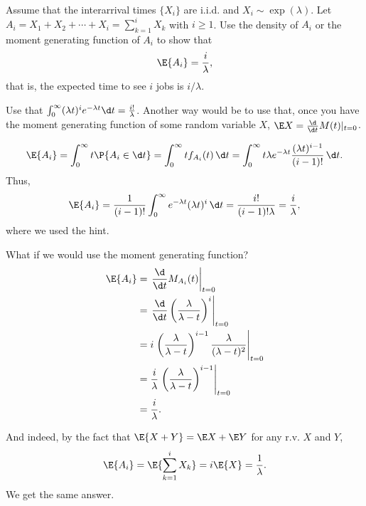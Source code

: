   \begin{question}
    Assume that the interarrival times $\{X_i\}$ are i.i.d. and
    $X_i\sim\exp(\lambda)$. Let
    $A_i=X_1+X_2+\cdots+X_i=\sum_{k=1}^i X_k$ with $i\geq 1$. Use the
    density of $A_i$ or the moment generating function of $A_i$ to
    show that
 \begin{equation*}
\E{A_i} = \frac i\lambda,
 \end{equation*}
 that is, the expected time to see $i$ jobs is $i/\lambda$.
 \begin{hint}
Use that
    $\int_0^\infty (\lambda t)^i e^{- \lambda t} \d t =
    \frac{i!}\lambda$.
    Another way would be to use that, once you have the moment
    generating function of some random variable $X$,
    $\E X = \frac{\d}{\d t} M(t) |_{t=0}$. 
 \end{hint}
  \begin{solution}
  \begin{equation*}
\E{A_i} = \int_0^\infty t \P{A_i \in \d t} = \int_0^\infty t f_{A_i} (t) \, \d t  = 
\int_0^\infty t  \lambda e^{-\lambda t} \frac{(\lambda t)^{i-1}}{(i-1)!}\, \d t.
  \end{equation*}
Thus, 
  \begin{equation*}
\E{A_i} = \frac{1}{(i-1)!} \int_0^\infty   e^{-\lambda t} (\lambda t)^i\,\d t = \frac{i!}{(i-1)!\lambda}=\frac{i}\lambda,
  \end{equation*}
  where we used the hint.

What if we would use the moment generating function? 
\begin{equation*}
  \begin{split}
    \E{A_i} 
&= \left.\frac{\d}{\d t} M_{A_i}(t)\right|_{t=0} \\
&= \left.\frac{\d}{\d t} \left(\frac{\lambda}{\lambda-t}\right)^i\right|_{t=0} \\
&= i \left.\left(\frac{\lambda}{\lambda-t}\right)^{i-1}\frac{\lambda}{(\lambda-t)^2}\right|_{t=0} \\
&= \frac i\lambda \left.\left(\frac{\lambda}{\lambda-t}\right)^{i-1}\right|_{t=0} \\
&= \frac i\lambda.
  \end{split}
\end{equation*}

And indeed, by the fact that $\E{X+Y}= \E X + \E Y$ for any r.v. $X$ and $Y$,
\begin{equation*}
\E{A_i} = \E{\sum_{k=1}^i X_k} = i \E{X} = \frac 1 \lambda.
\end{equation*}
We get the same answer. 
  \end{solution}
\end{question}


